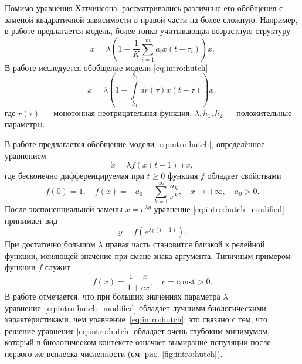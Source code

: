Помимо уравнения Хатчинсона, рассматривались различные его обобщения с заменой квадратичной зависимости в правой части на более сложную. Например, в работе \cite{Glyzin2007} предлагается модель, более тонко учитывающая возрастную структуру
\begin{equation}
\label{eq:intro:glyzin2007}
	\dot{x}=\lambda \left(1 - \frac{1}{K}\sum\limits_{i = 1}^{m} a_i x(t-\tau_i)\right) x.
\end{equation}
%
В работе \cite{Kaschenko2012} исследуется обобщение модели \eqref{eq:intro:hutch}
\begin{equation}
	\dot{x} = \lambda \left(1 - \int\limits_{h_1}^{h_2}dr(\tau)x(t - \tau)\right) x,
\end{equation}
где $r(\tau)$ --- монотонная неотрицательная функция, $\lambda, h_1, h_2$ --- положительные параметры.

В работе \cite{Kolesov2010} предлагается обобщение модели \eqref{eq:intro:hutch}, определённое уравнением
\begin{equation}
\label{eq:intro:hutch_modified}
	\dot{x} = \lambda f(x(t - 1)) x,
\end{equation}
%
где бесконечно дифференцируемая при $t \geq 0$ функция $f$ обладает свойствами
\[
f(0) = 1, \quad f(x) = -a_0 + \sum\limits_{k = 1}^{\infty} \frac{a_k}{x^k}, \quad x \to +\infty, \quad a_0 > 0.
\]
После экспоненциальной замены $x = e^{\lambda y}$ уравнение \eqref{eq:intro:hutch_modified} принимает вид
\begin{equation}
\label{eq:intro:hutch_modified_exp}
\dot{y} = f(e^{\lambda y(t - 1)}).
\end{equation}
При достаточно большом $\lambda$ правая часть становится близкой к релейной функции, меняющей значение при смене знака аргумента. Типичным примером функции $f$ служит
\[
f(x) = \dfrac{1 - x}{1 + cx}, \quad c = \text{const} > 0.
\]
В работе \cite{Kolesov2010} отмечается, что при больших значениях параметра $\lambda$ уравнение~\eqref{eq:intro:hutch_modified} обладает лучшими биологическими характеристиками, чем уравнение~\eqref{eq:intro:hutch}: это связано с тем, что решение уравнения \eqref{eq:intro:hutch} обладает очень глубоким минимумом, который в биологическом контексте означает вымирание популяции после первого же всплеска численности (см. рис. \ref{fig:intro:hutch}).


